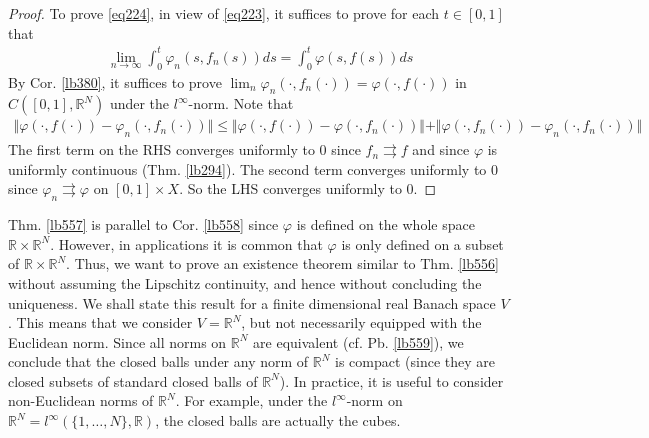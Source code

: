 \documentclass[12pt,b5paper,notitlepage]{article}
\theoremstyle{definition}
\theoremstyle{plain}
\newcommand{\Zbb}{\mathbb Z}
\newcommand{\Rbb}{\mathbb R}
\numberwithin{equation}{section}
\begin{document}
\begin{proof}
To prove \eqref{eq224}, in view of \eqref{eq223}, it suffices to prove for each $t\in[0,1]$ that
\begin{align*}
\lim_{n\rightarrow\infty}\int_0^t\varphi_n(s,f_n(s))ds=\int_0^t\varphi(s,f(s))ds
\end{align*}
By Cor. \ref{lb380}, it suffices to prove $\lim_n \varphi_n(\cdot,f_n(\cdot))=\varphi(\cdot,f(\cdot))$ in $C([0,1],\Rbb^N)$ under the $l^\infty$-norm. Note that
\begin{align*}
\Vert \varphi(\cdot,f(\cdot))-\varphi_n(\cdot,f_n(\cdot))\Vert\leq \Vert \varphi(\cdot,f(\cdot))-\varphi(\cdot,f_n(\cdot))\Vert+\Vert \varphi(\cdot,f_n(\cdot))-\varphi_n(\cdot,f_n(\cdot))\Vert
\end{align*}
The first term on the RHS converges uniformly to $0$ since $f_n\rightrightarrows f$ and since $\varphi$ is uniformly continuous (Thm. \ref{lb294}). The second term converges uniformly to $0$ since $\varphi_n\rightrightarrows \varphi$ on $[0,1]\times X$. So the LHS converges uniformly to $0$.
\end{proof}

\begin{comment}
By Thm. \ref{lb120}, it suffices to prove
\begin{align}\label{eq225}
\lim_{m,n\rightarrow\infty} \varphi_m(\cdot,f_n(\cdot))=\varphi(\cdot,f(\cdot)) 
\end{align}
For each $m$, $\varphi_m$ is uniformly continuous on the compact set $[0,1]\times X$ (by Thm. \ref{lb294}). Therefore, since $(f_n)$ converges uniformly to $f$, we obtain
\begin{align*}
\lim_{n\rightarrow\infty}\varphi_m(\cdot,f_n(\cdot))=\varphi_m(\cdot,f(\cdot))
\end{align*}
On the other hand, since $\lim_m\varphi_m$ converges uniformly to $\varphi$, we have
\begin{align*}
\lim_{m\rightarrow\infty}\sup_{n\in\Zbb_+} \big\Vert \varphi_m(\cdot,f_n(\cdot))-\varphi(\cdot,f_n(\cdot))\big\Vert_{C([0,1],\Rbb^N)}=0
\end{align*}
Thus, by Moore-Osgood Thm. \ref{lb289}, we get \eqref{eq225}.
\end{comment}



Thm. \ref{lb557} is parallel to Cor. \ref{lb558} since $\varphi$ is defined on the whole space $\Rbb\times\Rbb^N$. However, in applications it is common that $\varphi$ is only defined on a subset of $\Rbb\times\Rbb^N$. Thus, we want to prove an existence theorem similar to Thm. \ref{lb556} without assuming the Lipschitz continuity, and hence without concluding the uniqueness. We shall state this result for a finite dimensional real Banach space $V$. This means that we consider $V=\Rbb^N$, but not necessarily equipped with the Euclidean norm. Since all norms on $\Rbb^N$ are equivalent (cf. Pb. \ref{lb559}), we conclude that the closed balls under any norm of $\Rbb^N$ is compact (since they are closed subsets of standard closed balls of $\Rbb^N$). In practice, it is useful to consider non-Euclidean norms of $\Rbb^N$. For example, under the $l^\infty$-norm on $\Rbb^N=l^\infty(\{1,\dots,N\},\Rbb)$, the closed balls are actually the cubes. 
\end{document}
